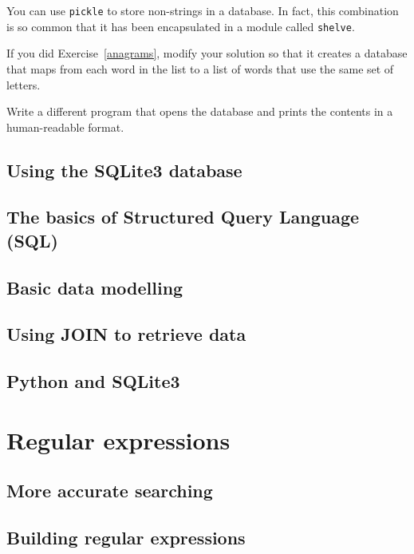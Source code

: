 \documentclass[10pt]{book}
\begin{document}
You can use {\tt pickle} to store non-strings in a database.
In fact, this combination is so common that it has been
encapsulated in a module called {\tt shelve}.  



\begin{ex}


If you did Exercise~\ref{anagrams}, modify your solution so that
it creates a database that maps from each word in the list to
a list of words that use the same set of letters.

Write a different program that opens the database and prints
the contents in a human-readable format.
\end{ex}



\section{Using the SQLite3 database}

\section{The basics of Structured Query Language (SQL)}

\section{Basic data modelling}

\section{Using JOIN to retrieve data}

\section{Python and SQLite3}

\chapter{Regular expressions}

\section{More accurate searching}

\section{Building regular expressions}
\end{document}

